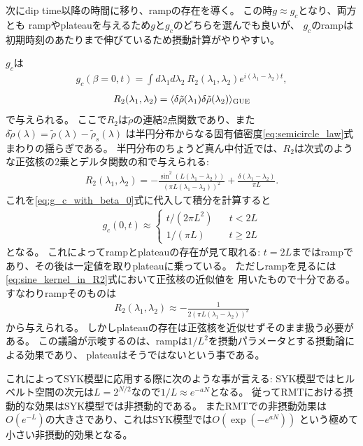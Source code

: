 次にdip time以降の時間に移り、rampの存在を導く。
この時$g \approx g_c$となり、両方とも
rampやplateauを与えるため$g$と$g_c$のどちらを選んでも良いが、
$g_c$のrampは初期時刻のあたりまで伸びているため摂動計算がやりやすい。

$g_c$は
\begin{align}
	g_c(\beta = 0, t)
	= \int d\lambda_1 d\lambda_2\ 
		R_2(\lambda_1, \lambda_2)e^{i(\lambda_1 - \lambda_2)t},
	\label{eq:g_c_with_beta_0}
\end{align}
\begin{align}
	R_2(\lambda_1, \lambda_2)
	= \langle \delta\tilde{\rho}(\lambda_1)\delta\tilde{\rho}(\lambda_2) \rangle_{\mathrm{GUE}}
	\label{eq:fourier_transfomed_g_c}
\end{align}
で与えられる。
ここで$R_2$は$\tilde{\rho}$の連結2点関数であり、また
$\delta\tilde{\rho}(\lambda) = \tilde{\rho}(\lambda) - \tilde{\rho}_s(\lambda)$
は半円分布からなる固有値密度\eqref{eq:semicircle_law}式まわりの揺らぎである。
半円分布のちょうど真ん中付近では、$R_2$は次式のような正弦核の2乗とデルタ関数の和で与えられる:
\begin{align}
	R_2(\lambda_1, \lambda_2)
	= -\frac{\sin^2(L(\lambda_1 - \lambda_2))}{(\pi L(\lambda_1 - \lambda_2))^2}
		+ \frac{\delta(\lambda_1 - \lambda_2)}{\pi L}.
	\label{eq:sine_kernel_in_R2}
\end{align}
これを\eqref{eq:g_c_with_beta_0}式に代入して積分を計算すると
\begin{align}
	g_c(0, t) \approx 
	\left\{
		\begin{matrix}
			t/(2\pi L^2) \hspace{20pt}t < 2L\\
			1/(\pi L)    \hspace{29pt}t \geq 2L
		\end{matrix}			
	\right.
\end{align}
となる。
これによってrampとplateauの存在が見て取れる:
$t = 2L$まではrampであり、その後は一定値を取りplateauに乗っている。
ただしrampを見るには\eqref{eq:sine_kernel_in_R2}式において正弦核の近似値を
用いたもので十分である。すなわりrampそのものは
\begin{align}
	R_2(\lambda_1, \lambda_2) \approx -\frac{1}{2(\pi L(\lambda_1 - \lambda_2))^2}
\end{align}
から与えられる。
しかしplateauの存在は正弦核を近似せずそのまま扱う必要がある。
この議論が示唆するのは、rampは$1/L^2$を摂動パラメータとする摂動論による効果であり、
plateauはそうではないという事である。

これによってSYK模型に応用する際に次のような事が言える:
SYK模型ではヒルベルト空間の次元は$L = 2^{N/2}$なので$1/L \approx e^{-aN}$となる。
従ってRMTにおける摂動的な効果はSYK模型では非摂動的である。
またRMTでの非摂動効果は$O(e^{-L})$の大きさであり、これはSYK模型では$O(\exp(-e^{aN}))$
という極めて小さい非摂動的効果となる。

